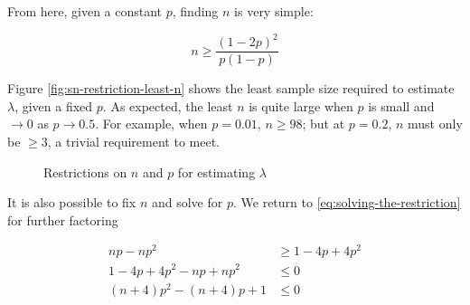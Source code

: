 From here, given a constant $p$, finding $n$ is very simple:

\begin{equation}
  n \geq \frac{(1-2p)^2}{p(1-p)} \label{eq: n for a given p}
\end{equation}

Figure \ref{fig:sn-restriction-least-n} shows the least sample size required to
estimate $\lambda$, given a fixed $p$. As expected, the least $n$ is quite
large when $p$ is small and $\to 0$ as $p \to 0.5$. For example, when $p =
0.01$, $n \geq 98$; but at $p = 0.2$, $n$ must only be $\geq 3$, a trivial
requirement to meet.

\begin{figure}
  \centering
  \quad
  \caption{Restrictions on $n$ and $p$ for estimating $\lambda$}
  \label{fig:sn-restriction}
\end{figure}

It is also possible to fix $n$ and solve for $p$. We return to
\eqref{eq:solving-the-restriction} for further factoring

\begin{align}
  np - np^2 &\geq 1 - 4p + 4p^2 \nonumber \\
  1 - 4p + 4p^2 - np + np^2 &\leq 0 \nonumber \\
  (n+4)p^2 - (n+4)p + 1 &\leq 0 \label{eq: solving for p}
\end{align}

